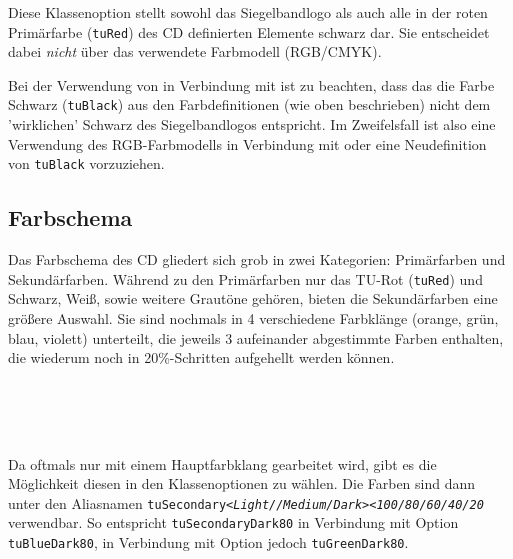 \begin{Declaration}
\end{Declaration}

Diese Klassenoption stellt sowohl das Siegelbandlogo als auch alle in der
roten Primärfarbe (\texttt{tuRed}) des CD definierten Elemente schwarz dar.
Sie entscheidet dabei \emph{nicht} über das verwendete Farbmodell (RGB/CMYK).
\begin{important}
  Bei der Verwendung von  in Verbindung mit 
  ist zu beachten, dass das die Farbe Schwarz (\texttt{tuBlack})
  aus den Farbdefinitionen (wie oben beschrieben) nicht dem 'wirklichen' Schwarz
  des Siegelbandlogos entspricht.
  Im Zweifelsfall ist also eine Verwendung des RGB-Farbmodells in Verbindung
  mit  oder eine Neudefinition von \texttt{tuBlack} vorzuziehen.
\end{important}

\subsection{Farbschema}

Das Farbschema des CD gliedert sich grob in zwei Kategorien: Primärfarben
und Sekundärfarben. Während zu den Primärfarben nur das TU-Rot (\texttt{tuRed})
und Schwarz, Weiß, sowie weitere Grautöne gehören, bieten die Sekundärfarben
eine größere Auswahl. Sie sind nochmals in 4 verschiedene Farbklänge
(orange, grün, blau, violett) unterteilt, die jeweils 3 aufeinander
abgestimmte Farben enthalten, die wiederum noch in 20\%-Schritten aufgehellt
werden können.

\begin{Declaration}
  \\
  \\
  \\
\end{Declaration}

\begin{sloppypar}
Da oftmals nur mit einem Hauptfarbklang gearbeitet wird, gibt es die Möglichkeit
diesen in den Klassenoptionen zu wählen. Die Farben sind dann unter den
Aliasnamen
\texttt{tuSecondary\textit{<Light//Medium/Dark>}\textit{<100/80/60/40/20}}
verwendbar.
So entspricht \texttt{tuSecondaryDark80} in Verbindung mit Option
 \texttt{tuBlueDark80}, in Verbindung mit Option 
jedoch \texttt{tuGreenDark80}.
\end{sloppypar}

